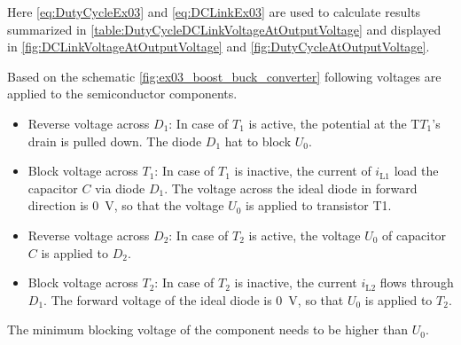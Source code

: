 
\begin{solutionblock}
    Here \eqref{eq:DutyCycleEx03} and \eqref{eq:DCLinkEx03} are used to calculate results summarized in \autoref{table:DutyCycleDCLinkVoltageAtOutputVoltage} 
    and displayed in \autoref{fig:DCLinkVoltageAtOutputVoltage} and \autoref{fig:DutyCycleAtOutputVoltage}.

    
    
    

\end{solutionblock}


\begin{solutionblock}
    Based on the schematic \autoref{fig:ex03_boost_buck_converter} following voltages are applied to the semiconductor components.
    \begin{itemize}
        \item Reverse voltage across $D_1$: In case of $T_1$ is active, the potential at the T$T_1$'s drain is pulled down. 
              The diode $D_1$ hat to block $U_0$.
        \item Block voltage across $T_1$: In case of $T_1$ is inactive, the current of $i_\mathrm{L1}$ load the capacitor $C$ via diode $D_1$. 
              The voltage across the ideal diode in forward direction is \SI{0}{\volt}, so that the voltage $U_0$ is applied to transistor T1.
        \item Reverse voltage across $D_2$: In case of $T_2$ is active, the voltage $U_0$ of capacitor $C$ is applied to $D_2$.
        \item Block voltage across $T_2$: In case of $T_2$ is inactive, the current $i_\mathrm{L2}$ flows through $D_1$. 
              The forward voltage of the ideal diode is \SI{0}{\volt}, so that $U_0$ is applied to $T_2$.
    \end{itemize}     
    The minimum blocking voltage of the component needs to be higher than $U_\mathrm{0}$.
\end{solutionblock}

